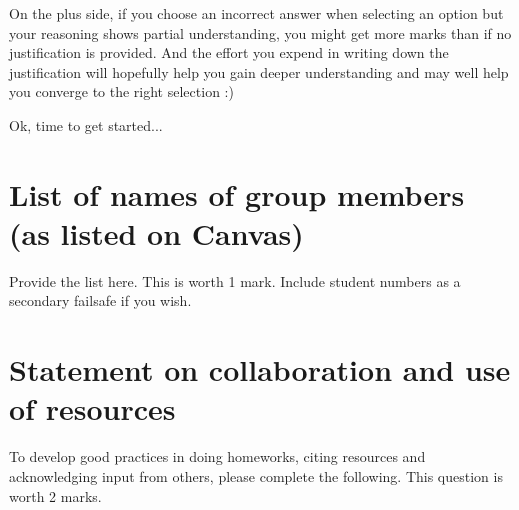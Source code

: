 \documentclass[11pt]{article}
\begin{document}
On the plus side, if you choose an incorrect answer when selecting an
option but your reasoning shows partial understanding, you might get
more marks than if no justification is provided. And the effort you
expend in writing down the justification will hopefully help you gain
deeper understanding and may well help you converge to the right
selection :)

Ok, time to get started...

\newpage
\vspace*{1pt}

\section{List of names of group members (as listed on Canvas)}

Provide the list here. This is worth 1 mark. Include student numbers
as a secondary failsafe if you wish.

\section{Statement on collaboration and use of resources}
To develop good practices in doing homeworks,
citing resources and acknowledging input from others, please complete the following.
This question is worth 2 marks.
\end{document}

